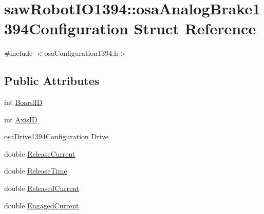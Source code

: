 \hypertarget{structsaw_robot_i_o1394_1_1osa_analog_brake1394_configuration}{\section{saw\-Robot\-I\-O1394\-:\-:osa\-Analog\-Brake1394\-Configuration Struct Reference}
\label{structsaw_robot_i_o1394_1_1osa_analog_brake1394_configuration}
}


{\ttfamily \#include $<$osa\-Configuration1394.\-h$>$}

\subsection*{Public Attributes}
\begin{DoxyCompactItemize}
\item 
int \hyperlink{structsaw_robot_i_o1394_1_1osa_analog_brake1394_configuration_a4291ae827ec158fd984ca6d9000da2e5}{Board\-I\-D}
\item 
int \hyperlink{structsaw_robot_i_o1394_1_1osa_analog_brake1394_configuration_a230499c3c03a554e756126c21c7f78ae}{Axis\-I\-D}
\item 
\hyperlink{structsaw_robot_i_o1394_1_1osa_drive1394_configuration}{osa\-Drive1394\-Configuration} \hyperlink{structsaw_robot_i_o1394_1_1osa_analog_brake1394_configuration_a1fde507ba37c196a4c1cf11ef85a1cc6}{Drive}
\item 
double \hyperlink{structsaw_robot_i_o1394_1_1osa_analog_brake1394_configuration_af5510d1dccfcdebef0ff4ddebc96a287}{Release\-Current}
\item 
double \hyperlink{structsaw_robot_i_o1394_1_1osa_analog_brake1394_configuration_aa948092dd9e95e724395762b36279c1d}{Release\-Time}
\item 
double \hyperlink{structsaw_robot_i_o1394_1_1osa_analog_brake1394_configuration_a84d601103d9975fabaccb7fc9b433a8d}{Released\-Current}
\item 
double \hyperlink{structsaw_robot_i_o1394_1_1osa_analog_brake1394_configuration_a813543fd6935dd9de1a6a225fe554d26}{Engaged\-Current}
\end{DoxyCompactItemize}


